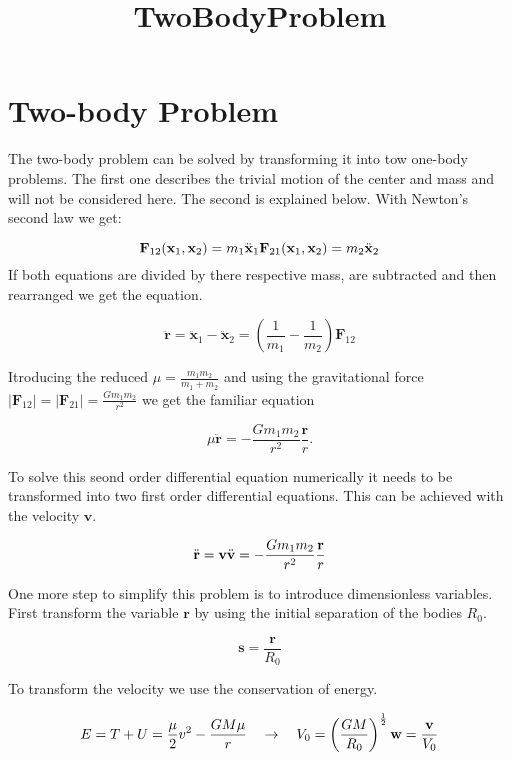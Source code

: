 \documentclass[11pt]{article}
\title{TwoBodyProblem}
\begin{document}
    
    \maketitle
    
    

    
    \hypertarget{two-body-problem}{%
\section{Two-body Problem}\label{two-body-problem}}

The two-body problem can be solved by transforming it into tow one-body
problems. The first one describes the trivial motion of the center and
mass and will not be considered here. The second is explained below.
With Newton's second law we get:

\[\textbf{F}_{12}(\textbf{x}_1,\textbf{x}_2)=m_1\ddot{\textbf{x}}_1\\\textbf{F}_{21}(\textbf{x}_1,\textbf{x}_2)=m_2\ddot{\textbf{x}}_2\]
If both equations are divided by there respective mass, are subtracted
and then rearranged we get the equation.

\[\ddot{\textbf{r}}=\ddot{\textbf{x}}_1-\ddot{\textbf{x}}_2=\left(\frac{1}{m_1}-\frac{1}{m_2}\right)\textbf{F}_{12}\]

Itroducing the reduced \(\mu = \frac{m_1m_2}{m_1+m_2}\) and using the
gravitational force
\(|\textbf{F}_{12}|=|\textbf{F}_{21}|=\frac{Gm_1m_2}{r^2}\) we get the
familiar equation

\[\mu\ddot{\textbf{r}}=-\frac{Gm_1m_2}{r^2}\frac{\textbf{r}}{r}.\]

To solve this seond order differential equation numerically it needs to
be transformed into two first order differential equations. This can be
achieved with the velocity \(\textbf{v}\).

\[\ddot{\textbf{r}}=\textbf{v}\\\ddot{\textbf{v}}=-\frac{Gm_1m_2}{r^2}\frac{\textbf{r}}{r}\]

One more step to simplify this problem is to introduce dimensionless
variables. First transform the variable \(\textbf{r}\) by using the
initial separation of the bodies \(R_0\).

\[\textbf{s}=\frac{\textbf{r}}{R_0}\]

To transform the velocity we use the conservation of energy.

\[E=T+U=\frac{\mu}{2}v^2-\frac{GM\mu}{r}\quad \rightarrow\quad V_0=\left(\frac{GM}{R_0}\right)^{\frac{1}{2}}\\\textbf{w}=\frac{\textbf{v}}{V_0}\]
\end{document}
